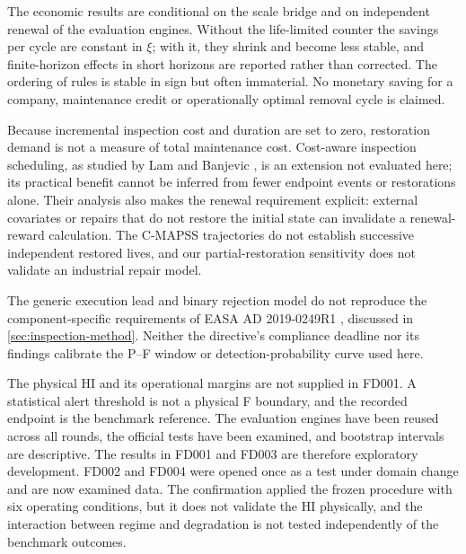 \documentclass[preprint,12pt]{elsarticle}
\begin{document}
The economic results are conditional on the scale bridge and on independent renewal of the evaluation engines. Without the life-limited counter the savings per cycle are constant in $\xi$; with it, they shrink and become less stable, and finite-horizon effects in short horizons are reported rather than corrected. The ordering of rules is stable in sign but often immaterial. No monetary saving for a company, maintenance credit or operationally optimal removal cycle is claimed.

Because incremental inspection cost and duration are set to zero, restoration demand is not a measure of total maintenance cost. Cost-aware inspection scheduling, as studied by Lam and Banjevic \cite{LamBanjevic2015}, is an extension not evaluated here; its practical benefit cannot be inferred from fewer endpoint events or restorations alone. Their analysis also makes the renewal requirement explicit: external covariates or repairs that do not restore the initial state can invalidate a renewal-reward calculation. The C-MAPSS trajectories do not establish successive independent restored lives, and our partial-restoration sensitivity does not validate an industrial repair model.

The generic execution lead and binary rejection model do not reproduce the component-specific requirements of EASA AD 2019-0249R1 \cite{EASA2019_0249R1}, discussed in \cref{sec:inspection-method}. Neither the directive's compliance deadline nor its findings calibrate the P--F window or detection-probability curve used here.

The physical HI and its operational margins are not supplied in FD001. A statistical alert threshold is not a physical F boundary, and the recorded endpoint is the benchmark reference. The evaluation engines have been reused across all rounds, the official tests have been examined, and bootstrap intervals are descriptive. The results in FD001 and FD003 are therefore exploratory development. FD002 and FD004 were opened once as a test under domain change and are now examined data. The confirmation applied the frozen procedure with six operating conditions, but it does not validate the HI physically, and the interaction between regime and degradation is not tested independently of the benchmark outcomes.
\end{document}
